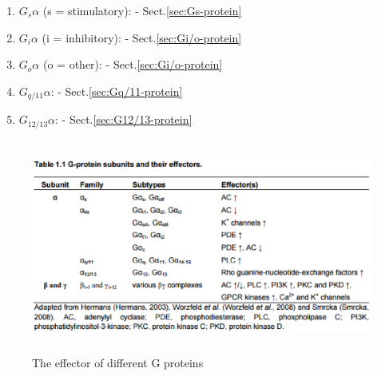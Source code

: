 \begin{enumerate}
  \item $G_s\alpha$ (s = stimulatory): - Sect.\ref{sec:Gs-protein}
  
  \item $G_i\alpha$ (i = inhibitory): - Sect.\ref{sec:Gi/o-protein}
  
  \item $G_o\alpha$ (o = other): - Sect.\ref{sec:Gi/o-protein} 
  
  \item $G_{q/11}\alpha$: - Sect.\ref{sec:Gq/11-protein}
  
  \item $G_{12/13}\alpha$: - Sect.\ref{sec:G12/13-protein}
\end{enumerate}


\begin{figure}[hbt]
 \centerline{\includegraphics[height=7cm]{./images/Gprotein-summary.eps}}
\caption{The effector of different G proteins}
\label{fig:G_protein-function}
\end{figure}




